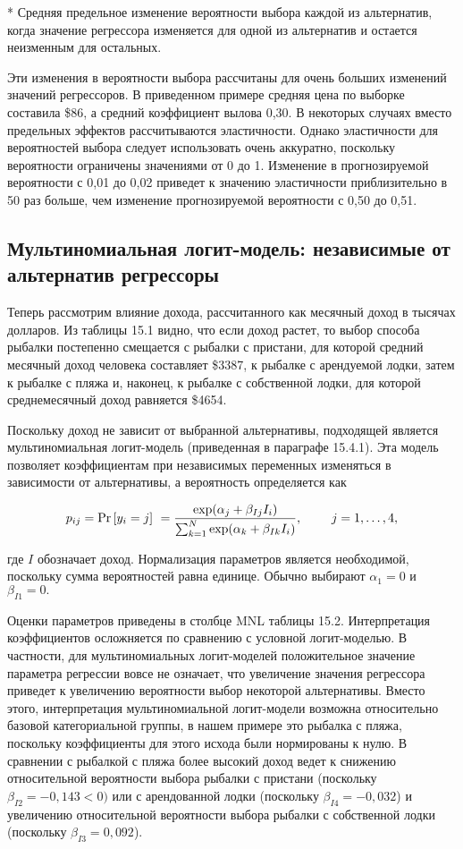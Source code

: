 * Средняя предельное изменение вероятности выбора каждой из альтернатив, когда значение регрессора изменяется для одной из альтернатив и остается неизменным для остальных.

Эти изменения в вероятности выбора рассчитаны для очень больших изменений значений регрессоров. В приведенном примере средняя цена по выборке составила \$86, а средний коэффициент вылова 0,30. В некоторых случаях вместо предельных эффектов рассчитываются эластичности. Однако эластичности для вероятностей выбора следует использовать очень аккуратно, поскольку вероятности ограничены значениями от 0 до 1. Изменение в прогнозируемой вероятности с 0,01 до 0,02 приведет к значению эластичности приблизительно в 50 раз больше, чем изменение прогнозируемой вероятности с 0,50 до 0,51. 

\subsection{Мультиномиальная логит-модель: независимые от альтернатив регрессоры}

Теперь рассмотрим влияние дохода, рассчитанного как месячный доход в тысячах долларов. Из таблицы 15.1 видно, что если доход растет, то выбор способа рыбалки постепенно смещается с рыбалки с пристани, для которой средний месячный доход человека составляет \$3387, к рыбалке с арендуемой лодки, затем к рыбалке с пляжа и, наконец, к рыбалке с собственной лодки, для которой среднемесячный доход равняется \$4654.

Поскольку доход не зависит от выбранной альтернативы, подходящей является мультиномиальная логит-модель (приведенная в параграфе 15.4.1). Эта модель позволяет коэффициентам при независимых переменных изменяться в зависимости от альтернативы, а вероятность определяется как

\[p_{ij}={\Pr  \left[y_i=j\right]\ }=
\frac{{\rm exp}({\alpha }_j+{\beta }_{Ij}I_i)}
{\sum^N_{k=1}{{\rm exp}({\alpha }_k+{\beta }_{Ik}I_i)}},
\ \ \ \ \ \ \ j=1,\dots ,4,\] 

где $I$ обозначает доход. Нормализация параметров является необходимой, поскольку сумма вероятностей равна единице. Обычно выбирают ${\alpha }_1=0$ и ${\beta }_{I1}=0.$

Оценки параметров приведены в столбце MNL таблицы 15.2. Интерпретация коэффициентов осложняется по сравнению с условной логит-моделью. В частности, для мультиномиальных логит-моделей положительное значение параметра регрессии вовсе не означает, что увеличение значения регрессора приведет к увеличению вероятности выбор некоторой альтернативы. Вместо этого, интерпретация мультиномиальной логит-модели возможна относительно базовой категориальной группы, в нашем примере это рыбалка с пляжа, поскольку коэффициенты для этого исхода были нормированы к нулю. В сравнении с рыбалкой с пляжа более высокий доход ведет к снижению относительной вероятности выбора рыбалки с пристани (поскольку ${\beta }_{I2}=-0,143<0)$ или с арендованной лодки (поскольку ${\beta }_{I4}=-0,032$) и увеличению относительной вероятности выбора рыбалки с собственной лодки (поскольку ${\beta }_{I3}=0,092$).

